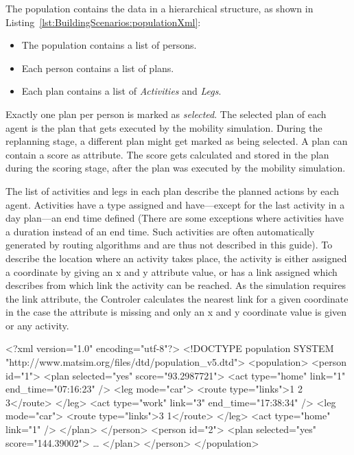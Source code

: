 The population contains the data in a hierarchical structure, as shown in
Listing~\ref{lst:BuildingScenarios:populationXml}:
\begin{itemize}\styleItemize
  \item The population contains a list of persons.
  \item Each person contains a list of plans.
  \item Each plan contains a list of \emph{Activities} and \emph{Legs}.
\end{itemize}
Exactly one plan per person is marked as \emph{selected}. The selected plan of
each agent is the plan that gets executed by the mobility simulation. During the
replanning stage, a different plan might get marked as being selected. A plan
can contain a score as attribute. The score gets calculated and stored in the
plan during the scoring stage, after the plan was executed by the mobility
simulation.

The list of activities and legs in each plan describe the planned actions by
each agent. Activities have a type assigned and have---except for the last
activity in a day plan---an end time defined (There are some exceptions where
activities have a duration instead of an end time. Such activities are often
automatically generated by routing algorithms and are thus not described in
this guide). To describe the location where an activity takes place, the
activity is either assigned a coordinate by giving an x and y attribute value,
or has a link assigned which describes from which link the activity can be
reached. As the simulation requires the link attribute, the Controler calculates
the nearest link for a given coordinate in the case the attribute is missing and
only an x and y coordinate value is given or any activity.

\begin{xml-file}[caption=An example of a population.xml,
label=lst:BuildingScenarios:populationXml]
<?xml version="1.0" encoding="utf-8"?>
<!DOCTYPE population SYSTEM "http://www.matsim.org/files/dtd/population_v5.dtd">
<population>
	<person id="1">
		<plan selected="yes" score="93.2987721">
			<act type="home" link="1" end_time="07:16:23" />
			<leg mode="car">
				<route type="links">1 2 3</route>
			</leg>
			<act type="work" link="3" end_time="17:38:34" />
			<leg mode="car">
				<route type="links">3 1</route>
			</leg>
			<act type="home" link="1" />
		</plan>
	</person>
	<person id="2">
		<plan selected="yes" score="144.39002">
			\ldots
		</plan>
	</person>
</population>
\end{xml-file}

